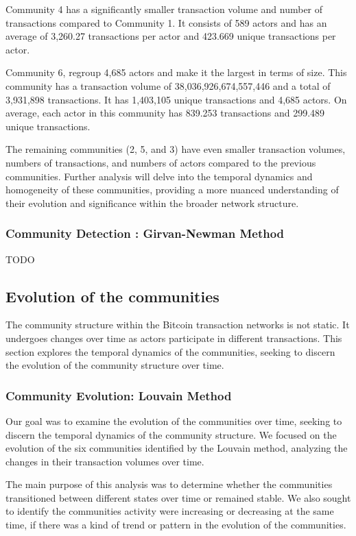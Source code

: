\documentclass[a4paper, 12pt]{article}
\begin{document}
Community 4 has a significantly smaller transaction volume and number of transactions compared to Community 1. It consists of 589 actors and has an average of 3,260.27 transactions per actor and 423.669 unique transactions per actor.

Community 6, regroup 4,685 actors and make it the largest in terms of size. This community has a transaction volume of 38,036,926,674,557,446 and a total of 3,931,898 transactions. 
It has 1,403,105 unique transactions and 4,685 actors. On average, each actor in this community has 839.253 transactions and 299.489 unique transactions.

The remaining communities (2, 5, and 3) have even smaller transaction volumes, numbers of transactions, and numbers of actors compared to the previous communities.
Further analysis will delve into the temporal dynamics and homogeneity of these communities, providing a more nuanced understanding of their evolution and significance within the broader network structure.


\subsubsection{Community Detection : Girvan-Newman Method}
TODO

\newpage

\subsection{Evolution of the communities}
The community structure within the Bitcoin transaction networks is not static. It undergoes changes over time as actors participate in different transactions.
This section explores the temporal dynamics of the communities, seeking to discern the evolution of the community structure over time.

\subsubsection{Community Evolution: Louvain Method}

Our goal was to examine the evolution of the communities over time, seeking to discern the temporal dynamics of the community structure. 
We focused on the evolution of the six communities identified by the Louvain method, analyzing the changes in their transaction volumes over time.

The main purpose of this analysis was to determine whether the communities transitioned between different states over time or remained stable. 
We also sought to identify the communities activity were increasing or decreasing at the same time, if there was a kind of trend or pattern in the evolution of the communities.
\end{document}
